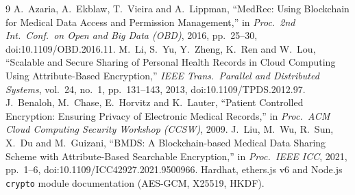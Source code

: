 \documentclass[11pt,a4paper]{article}
\begin{document}
\begin{thebibliography}{9}
\setlength{\itemsep}{0pt}\small
{} A.~Azaria, A.~Ekblaw, T.~Vieira and A.~Lippman, ``MedRec: Using Blockchain for Medical Data Access and Permission Management,'' in \emph{Proc.\ 2nd Int.\ Conf.\ on Open and Big Data (OBD)}, 2016, pp.~25--30, doi:10.1109/OBD.2016.11.
 M.~Li, S.~Yu, Y.~Zheng, K.~Ren and W.~Lou, ``Scalable and Secure Sharing of Personal Health Records in Cloud Computing Using Attribute-Based Encryption,'' \emph{IEEE Trans.\ Parallel and Distributed Systems}, vol.~24, no.~1, pp.~131--143, 2013, doi:10.1109/TPDS.2012.97.
 J.~Benaloh, M.~Chase, E.~Horvitz and K.~Lauter, ``Patient Controlled Encryption: Ensuring Privacy of Electronic Medical Records,'' in \emph{Proc.\ ACM Cloud Computing Security Workshop (CCSW)}, 2009.
 J.~Liu, M.~Wu, R.~Sun, X.~Du and M.~Guizani, ``BMDS: A Blockchain-based Medical Data Sharing Scheme with Attribute-Based Searchable Encryption,'' in \emph{Proc.\ IEEE ICC}, 2021, pp.~1--6, doi:10.1109/ICC42927.2021.9500966.
 Hardhat, ethers.js v6 and Node.js \texttt{crypto} module documentation (AES-GCM, X25519, HKDF).
\end{thebibliography}
\end{document}
